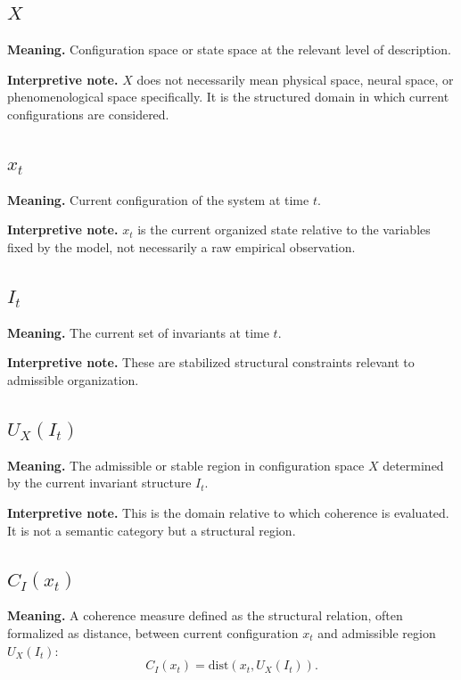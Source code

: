 \documentclass[11pt,a4paper]{article}
\begin{document}
	\subsection{$X$}
	
	\textbf{Meaning.} Configuration space or state space at the relevant level of description.
	
	\textbf{Interpretive note.} $X$ does not necessarily mean physical space, neural space, or phenomenological space specifically. It is the structured domain in which current configurations are considered.
	
	\subsection{$x_t$}
	
	\textbf{Meaning.} Current configuration of the system at time $t$.
	
	\textbf{Interpretive note.} $x_t$ is the current organized state relative to the variables fixed by the model, not necessarily a raw empirical observation.
	
	\subsection{$I_t$}
	
	\textbf{Meaning.} The current set of invariants at time $t$.
	
	\textbf{Interpretive note.} These are stabilized structural constraints relevant to admissible organization.
	
	\subsection{$U_X(I_t)$}
	
	\textbf{Meaning.} The admissible or stable region in configuration space $X$ determined by the current invariant structure $I_t$.
	
	\textbf{Interpretive note.} This is the domain relative to which coherence is evaluated. It is not a semantic category but a structural region.
	
	\subsection{$C_I(x_t)$}
	
	\textbf{Meaning.} A coherence measure defined as the structural relation, often formalized as distance, between current configuration $x_t$ and admissible region $U_X(I_t)$:
	\[
	C_I(x_t)=\mathrm{dist}(x_t,U_X(I_t)).
	\]
	
\end{document}
